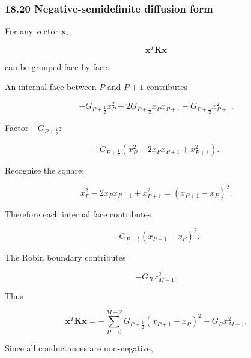 \documentclass[11pt,a4paper]{article}
\begin{document}
\subsubsection*{18.20 Negative-semidefinite diffusion form}

For any vector $\mathbf x$,

\begin{equation}
\mathbf x^T\mathbf K\mathbf x
\tag{TRISO-FV-268}
\label{eq:triso-fv-268}
\end{equation}

can be grouped face-by-face.

An internal face between $P$ and $P+1$ contributes

\begin{equation}
-G_{P+\frac12}x_P^2
+
2G_{P+\frac12}x_Px_{P+1}
-
G_{P+\frac12}x_{P+1}^2.
\tag{TRISO-FV-269}
\label{eq:triso-fv-269}
\end{equation}

Factor $-G_{P+\frac12}$:

\begin{equation}
-G_{P+\frac12}
\left(
x_P^2
-
2x_Px_{P+1}
+
x_{P+1}^2
\right).
\tag{TRISO-FV-270}
\label{eq:triso-fv-270}
\end{equation}

Recognise the square:

\begin{equation}
x_P^2
-
2x_Px_{P+1}
+
x_{P+1}^2
=
(x_{P+1}-x_P)^2.
\tag{TRISO-FV-271}
\label{eq:triso-fv-271}
\end{equation}

Therefore each internal face contributes

\begin{equation}
-G_{P+\frac12}
(x_{P+1}-x_P)^2.
\tag{TRISO-FV-272}
\label{eq:triso-fv-272}
\end{equation}

The Robin boundary contributes

\begin{equation}
-G_Rx_{M-1}^2.
\tag{TRISO-FV-273}
\label{eq:triso-fv-273}
\end{equation}

Thus

\begin{equation}
\boxed{
\mathbf x^T\mathbf K\mathbf x
=
-
\sum_{P=0}^{M-2}
G_{P+\frac12}
(x_{P+1}-x_P)^2
-
G_Rx_{M-1}^2.
}
\tag{TRISO-FV-274}
\label{eq:triso-fv-274}
\end{equation}

Since all conductances are non-negative,
\end{document}
